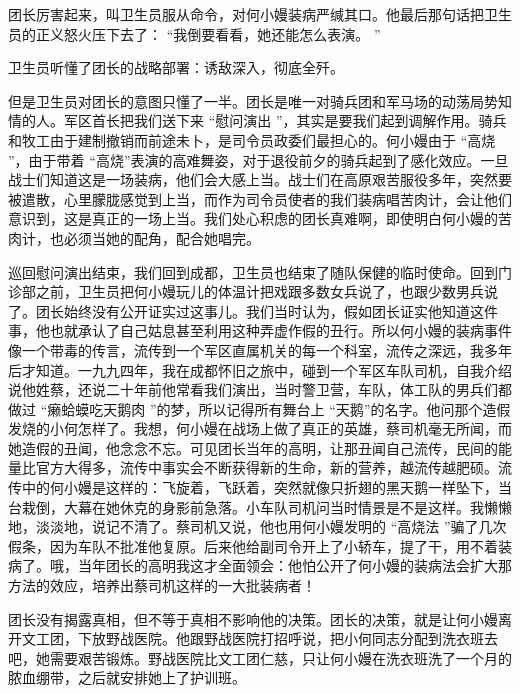 \documentclass[12pt,twoside,openany]{book}
\begin{document}
团长厉害起来，叫卫生员服从命令，对何小嫚装病严缄其口。他最后那句话把卫生员的正义怒火压下去了： “我倒要看看，她还能怎么表演。 ”

卫生员听懂了团长的战略部署：诱敌深入，彻底全歼。

但是卫生员对团长的意图只懂了一半。团长是唯一对骑兵团和军马场的动荡局势知情的人。军区首长把我们送下来 “慰问演出 ”，其实是要我们起到调解作用。骑兵和牧工由于建制撤销而前途未卜，是司令员政委们最担心的。何小嫚由于 “高烧 ”，由于带着 “高烧”表演的高难舞姿，对于退役前夕的骑兵起到了感化效应。一旦战士们知道这是一场装病，他们会大感上当。战士们在高原艰苦服役多年，突然要被遣散，心里朦胧感觉到上当，而作为司令员使者的我们装病唱苦肉计，会让他们意识到，这是真正的一场上当。我们处心积虑的团长真难啊，即使明白何小嫚的苦肉计，也必须当她的配角，配合她唱完。

巡回慰问演出结束，我们回到成都，卫生员也结束了随队保健的临时使命。回到门诊部之前，卫生员把何小嫚玩儿的体温计把戏跟多数女兵说了，也跟少数男兵说了。团长始终没有公开证实过这事儿。我们当时认为，假如团长证实他知道这件事，他也就承认了自己姑息甚至利用这种弄虚作假的丑行。所以何小嫚的装病事件像一个带毒的传言，流传到一个军区直属机关的每一个科室，流传之深远，我多年后才知道。一九九四年，我在成都怀旧之旅中，碰到一个军区车队司机，自我介绍说他姓蔡，还说二十年前他常看我们演出，当时警卫营，车队，体工队的男兵们都做过 “癞蛤蟆吃天鹅肉 ”的梦，所以记得所有舞台上 “天鹅”的名字。他问那个造假发烧的小何怎样了。我想，何小嫚在战场上做了真正的英雄，蔡司机毫无所闻，而她造假的丑闻，他念念不忘。可见团长当年的高明，让那丑闻自己流传，民间的能量比官方大得多，流传中事实会不断获得新的生命，新的营养，越流传越肥硕。流传中的何小嫚是这样的：飞旋着，飞跃着，突然就像只折翅的黑天鹅一样坠下，当台栽倒，大幕在她休克的身影前急落。小车队司机问当时情景是不是这样。我懒懒地，淡淡地，说记不清了。蔡司机又说，他也用何小嫚发明的 “高烧法 ”骗了几次假条，因为车队不批准他复原。后来他给副司令开上了小轿车，提了干，用不着装病了。哦，当年团长的高明我这才全面领会：他怕公开了何小嫚的装病法会扩大那方法的效应，培养出蔡司机这样的一大批装病者！

团长没有揭露真相，但不等于真相不影响他的决策。团长的决策，就是让何小嫚离开文工团，下放野战医院。他跟野战医院打招呼说，把小何同志分配到洗衣班去吧，她需要艰苦锻炼。野战医院比文工团仁慈，只让何小嫚在洗衣班洗了一个月的脓血绷带，之后就安排她上了护训班。
\end{document}
